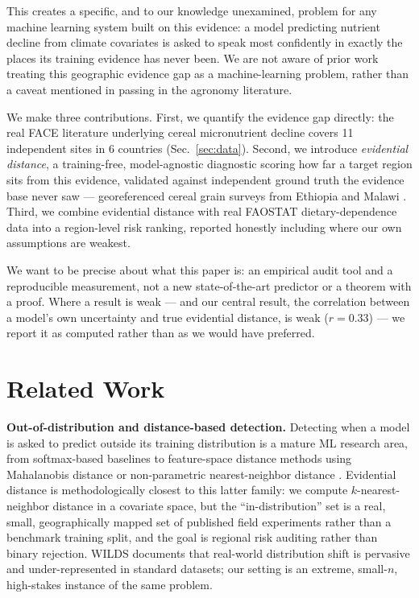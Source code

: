 \documentclass{article}
\begin{document}
This creates a specific, and to our knowledge unexamined, problem for any machine learning system built on this evidence: a model predicting nutrient decline from climate covariates is asked to speak most confidently in exactly the places its training evidence has never been. We are not aware of prior work treating this geographic evidence gap as a machine-learning problem, rather than a caveat mentioned in passing in the agronomy literature.

We make three contributions. First, we quantify the evidence gap directly: the real FACE literature underlying cereal micronutrient decline covers 11 independent sites in 6 countries (Sec.~\ref{sec:data}). Second, we introduce \emph{evidential distance}, a training-free, model-agnostic diagnostic scoring how far a target region sits from this evidence, validated against independent ground truth the evidence base never saw --- georeferenced cereal grain surveys from Ethiopia and Malawi \citep{kumssa2022geonutrition}. Third, we combine evidential distance with real FAOSTAT dietary-dependence data into a region-level risk ranking, reported honestly including where our own assumptions are weakest.

We want to be precise about what this paper is: an empirical audit tool and a reproducible measurement, not a new state-of-the-art predictor or a theorem with a proof. Where a result is weak --- and our central result, the correlation between a model's own uncertainty and true evidential distance, is weak ($r=0.33$) --- we report it as computed rather than as we would have preferred.

\section{Related Work}

\textbf{Out-of-distribution and distance-based detection.} Detecting when a model is asked to predict outside its training distribution is a mature ML research area, from softmax-based baselines \citep{hendrycks2017baseline} to feature-space distance methods using Mahalanobis distance \citep{lee2018simple} or non-parametric nearest-neighbor distance \citep{sun2022outofdistribution}. Evidential distance is methodologically closest to this latter family: we compute $k$-nearest-neighbor distance in a covariate space, but the ``in-distribution'' set is a real, small, geographically mapped set of published field experiments rather than a benchmark training split, and the goal is regional risk auditing rather than binary rejection. WILDS \citep{koh2021wilds} documents that real-world distribution shift is pervasive and under-represented in standard datasets; our setting is an extreme, small-$n$, high-stakes instance of the same problem.
\end{document}

